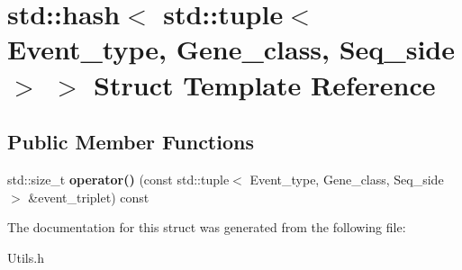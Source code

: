 \hypertarget{structstd_1_1hash_3_01std_1_1tuple_3_01Event__type_00_01Gene__class_00_01Seq__side_01_4_01_4}{}\section{std\+:\+:hash$<$ std\+:\+:tuple$<$ Event\+\_\+type, Gene\+\_\+class, Seq\+\_\+side $>$ $>$ Struct Template Reference}
\label{structstd_1_1hash_3_01std_1_1tuple_3_01Event__type_00_01Gene__class_00_01Seq__side_01_4_01_4}
\subsection*{Public Member Functions}
\begin{DoxyCompactItemize}
\item 
\mbox{\label{structstd_1_1hash_3_01std_1_1tuple_3_01Event__type_00_01Gene__class_00_01Seq__side_01_4_01_4_a60d78c7445b883d81ba8c8761c51e940}} 
std\+::size\+\_\+t {\bfseries operator()} (const std\+::tuple$<$ Event\+\_\+type, Gene\+\_\+class, Seq\+\_\+side $>$ \&event\+\_\+triplet) const
\end{DoxyCompactItemize}


The documentation for this struct was generated from the following file\+:\begin{DoxyCompactItemize}
\item 
Utils.\+h\end{DoxyCompactItemize}

